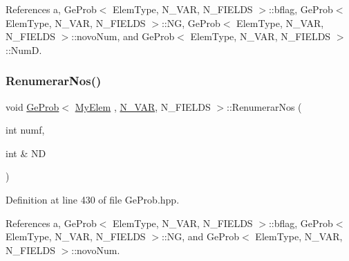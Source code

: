 References a, Ge\+Prob$<$ Elem\+Type, N\+\_\+\+V\+A\+R, N\+\_\+\+F\+I\+E\+L\+D\+S $>$\+::bflag, Ge\+Prob$<$ Elem\+Type, N\+\_\+\+V\+A\+R, N\+\_\+\+F\+I\+E\+L\+D\+S $>$\+::\+NG, Ge\+Prob$<$ Elem\+Type, N\+\_\+\+V\+A\+R, N\+\_\+\+F\+I\+E\+L\+D\+S $>$\+::novo\+Num, and Ge\+Prob$<$ Elem\+Type, N\+\_\+\+V\+A\+R, N\+\_\+\+F\+I\+E\+L\+D\+S $>$\+::\+NumD.

\mbox{\label{classGeProb_aa656597aedeff1096736c98b1f51c55f}} 
\subsubsection{\texorpdfstring{Renumerar\+Nos()}{RenumerarNos()}\hspace{0.1cm}{\footnotesize\ttfamily [2/2]}}
{\footnotesize\ttfamily void \hyperlink{classGeProb}{Ge\+Prob}$<$ \hyperlink{DG__Prob_8h_a83cd887ced9a6587428f267e50cd4787}{My\+Elem} , \hyperlink{classED__Prob_a4e7d2ff1a8e435e336fb00c527224b5a}{N\+\_\+\+V\+AR}, N\+\_\+\+F\+I\+E\+L\+DS $>$\+::Renumerar\+Nos (\begin{DoxyParamCaption}\item[{int}]{numf,  }\item[{int \&}]{ND }\end{DoxyParamCaption})\hspace{0.3cm}{\ttfamily [inherited]}}



Definition at line 430 of file Ge\+Prob.\+hpp.



References a, Ge\+Prob$<$ Elem\+Type, N\+\_\+\+V\+A\+R, N\+\_\+\+F\+I\+E\+L\+D\+S $>$\+::bflag, Ge\+Prob$<$ Elem\+Type, N\+\_\+\+V\+A\+R, N\+\_\+\+F\+I\+E\+L\+D\+S $>$\+::\+NG, and Ge\+Prob$<$ Elem\+Type, N\+\_\+\+V\+A\+R, N\+\_\+\+F\+I\+E\+L\+D\+S $>$\+::novo\+Num.

\mbox{\label{classGeProb_a479ff26c0f91f09a7b92cabf9894c64e}} 
